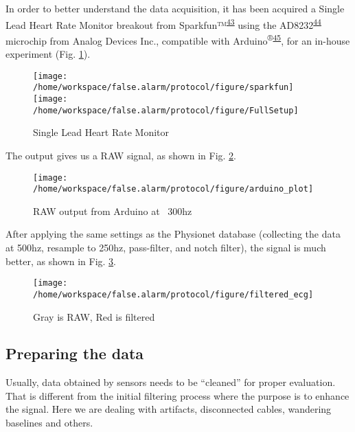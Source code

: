 \documentclass[12pt,twoside]{fmupthesis}
\begin{document}
In order to better understand the data acquisition, it has been acquired a Single Lead Heart Rate
Monitor breakout from Sparkfun™\textsuperscript{\protect\hyperlink{ref-sparkfun2021}{43}} using the AD8232\textsuperscript{\protect\hyperlink{ref-AnalogDevices2020}{44}} microchip
from Analog Devices Inc., compatible with Arduino\textsuperscript{®}\textsuperscript{\protect\hyperlink{ref-arduino2021}{45}}, for an in-house experiment
(Fig. \ref{fig:ad8232}).
\begin{figure}

{\centering \texttt{[image: /home/workspace/false.alarm/protocol/figure/sparkfun]} \texttt{[image: /home/workspace/false.alarm/protocol/figure/FullSetup]} 

}

\caption{Single Lead Heart Rate Monitor}\label{fig:ad8232}
\end{figure}
The output gives us a RAW signal, as shown in Fig. \ref{fig:rawsignal}.
\begin{figure}

{\centering \texttt{[image: /home/workspace/false.alarm/protocol/figure/arduino\_plot]} 

}

\caption{RAW output from Arduino at ~300hz}\label{fig:rawsignal}
\end{figure}
After applying the same settings as the Physionet database (collecting the data at 500hz, resample
to 250hz, pass-filter, and notch filter), the signal is much better, as shown in Fig.
\ref{fig:filtersignal}.
\begin{figure}

{\centering \texttt{[image: /home/workspace/false.alarm/protocol/figure/filtered\_ecg]} 

}

\caption{Gray is RAW, Red is filtered}\label{fig:filtersignal}
\end{figure}
\hypertarget{preparing-the-data}{%
\subsection{Preparing the data}\label{preparing-the-data}}

Usually, data obtained by sensors needs to be ``cleaned'' for proper evaluation. That is different
from the initial filtering process where the purpose is to enhance the signal. Here we are dealing
with artifacts, disconnected cables, wandering baselines and others.
\end{document}
